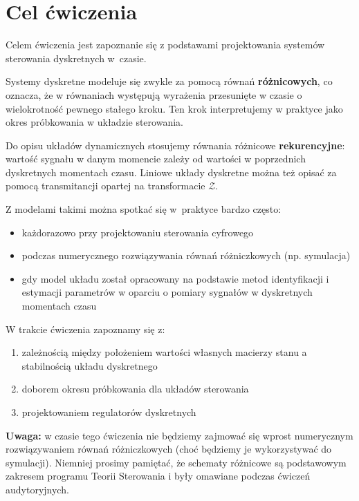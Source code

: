 \documentclass{sprawozdanie-agh}
\begin{document}

\stronatytulowa{}

\section{Cel ćwiczenia}


Celem ćwiczenia jest zapoznanie się z podstawami projektowania systemów sterowania dyskretnych w~czasie.

Systemy dyskretne modeluje się zwykle za pomocą równań \textbf{różnicowych}, co oznacza, że w równaniach występują wyrażenia przesunięte w czasie o wielokrotność pewnego stałego kroku. Ten krok interpretujemy w praktyce jako okres próbkowania w układzie sterowania. 

Do opisu układów dynamicznych stosujemy równania różnicowe \textbf{rekurencyjne}: wartość sygnału w danym momencie zależy od wartości w poprzednich dyskretnych momentach czasu.
Liniowe układy dyskretne można też opisać za pomocą transmitancji opartej na transformacie $\mathcal{Z}$.

Z modelami takimi można spotkać się w~praktyce bardzo często:
\begin{itemize}
    \item każdorazowo przy projektowaniu sterowania cyfrowego
    \item podczas numerycznego rozwiązywania równań różniczkowych (np. symulacja)
    \item gdy model układu został opracowany na podstawie metod identyfikacji i estymacji parametrów w oparciu o pomiary sygnałów w dyskretnych momentach czasu 
\end{itemize} 

W trakcie ćwiczenia zapoznamy się z:
\begin{enumerate}
    \item zależnością między położeniem wartości własnych macierzy stanu a stabilnością układu dyskretnego
    \item doborem okresu próbkowania dla układów sterowania
    \item projektowaniem regulatorów dyskretnych 
\end{enumerate}

\textbf{Uwaga:} w czasie tego ćwiczenia nie będziemy zajmować się wprost numerycznym rozwiązywaniem równań różniczkowych (choć będziemy je wykorzystywać do symulacji).
Niemniej prosimy pamiętać, że schematy różnicowe są podstawowym zakresem programu Teorii Sterowania i były omawiane podczas ćwiczeń audytoryjnych.
\end{document}
